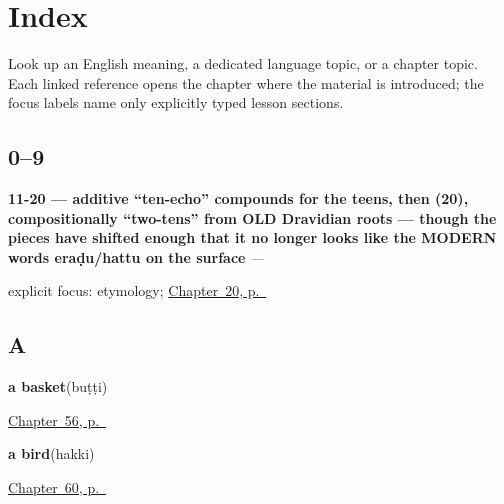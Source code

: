 
\chapter*{Index}

Look up an English meaning, a dedicated language topic, or a chapter topic. Each linked reference opens the chapter where the material is introduced; the focus labels name only explicitly typed lesson sections.

\section*{0--9}

\noindent\begin{minipage}[t]{\linewidth}
\raggedright
\textbf{11-20 — additive \textquotedblleft{}ten-echo\textquotedblright{} compounds for the teens, then  (20), compositionally \textquotedblleft{}two-tens\textquotedblright{} from OLD Dravidian roots — though the pieces have shifted enough that it no longer looks like the MODERN words eraḍu/hattu on the surface}\enspace\emph{ — }\par
\footnotesize explicit focus: etymology; \hyperref[ch:ka-numbers-and-weather]{Chapter~20, p.~\pageref*{ch:ka-numbers-and-weather}}
\end{minipage}\par\smallskip

\section*{A}

\noindent\begin{minipage}[t]{\linewidth}
\raggedright
\textbf{a basket}\enspace\emph{}\enspace(buṭṭi)\par
\footnotesize \hyperref[ch:ka-house]{Chapter~56, p.~\pageref*{ch:ka-house}}
\end{minipage}\par\smallskip

\noindent\begin{minipage}[t]{\linewidth}
\raggedright
\textbf{a bird}\enspace\emph{}\enspace(hakki)\par
\footnotesize \hyperref[ch:ka-animals]{Chapter~60, p.~\pageref*{ch:ka-animals}}
\end{minipage}\par\smallskip

